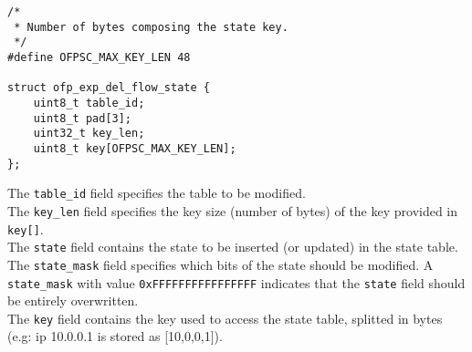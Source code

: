 \scriptsize\begin{verbatim}
/*
 * Number of bytes composing the state key.
 */
#define OFPSC_MAX_KEY_LEN 48

struct ofp_exp_del_flow_state {
    uint8_t table_id;
    uint8_t pad[3];
    uint32_t key_len;
    uint8_t key[OFPSC_MAX_KEY_LEN];
};
\end{verbatim}\normalsize
The \texttt{table\_id} field specifies the table to be modified.
\\
The \texttt{key\_len} field specifies the key size (number of bytes) of the key provided in \texttt{key[]}.
\\
The \texttt{state} field contains the state to be inserted (or updated) in the state table. 
\\
The \texttt{state\_mask} field specifies which bits of the state should be modified. A \texttt{state\_mask} with value \texttt{0xFFFFFFFFFFFFFFFF} indicates that the \texttt{state} field should be entirely overwritten.
\\
The \texttt{key} field contains the key used to access the state table, splitted in bytes (e.g: ip 10.0.0.1 is stored as [10,0,0,1]).

